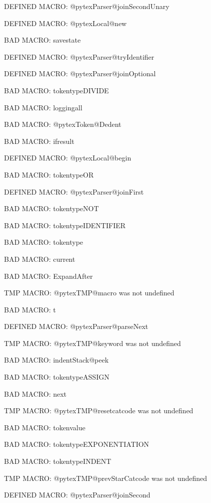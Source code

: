 \ifx\@pytexParser@joinSecondUnary\undefined\else DEFINED MACRO: @pytexParser@joinSecondUnary
\fi

\ifx\@pytexLocal@new\undefined\else DEFINED MACRO: @pytexLocal@new
\fi

BAD MACRO: savestate

\ifx\@pytexParser@tryIdentifier\undefined\else DEFINED MACRO: @pytexParser@tryIdentifier
\fi

\ifx\@pytexParser@joinOptional\undefined\else DEFINED MACRO: @pytexParser@joinOptional
\fi

BAD MACRO: tokentypeDIVIDE

BAD MACRO: loggingall

BAD MACRO: @pytexToken@Dedent

BAD MACRO: ifresult

\ifx\@pytexLocal@begin\undefined\else DEFINED MACRO: @pytexLocal@begin
\fi

BAD MACRO: tokentypeOR

\ifx\@pytexParser@joinFirst\undefined\else DEFINED MACRO: @pytexParser@joinFirst
\fi

BAD MACRO: tokentypeNOT

BAD MACRO: tokentypeIDENTIFIER

BAD MACRO: tokentype

BAD MACRO: current

BAD MACRO: ExpandAfter

\ifx\@pytexTMP@macro\undefined\else TMP MACRO: @pytexTMP@macro was not undefined
\fi

BAD MACRO: t

\ifx\@pytexParser@parseNext\undefined\else DEFINED MACRO: @pytexParser@parseNext
\fi

\ifx\@pytexTMP@keyword\undefined\else TMP MACRO: @pytexTMP@keyword was not undefined
\fi

BAD MACRO: indentStack@peek

BAD MACRO: tokentypeASSIGN

BAD MACRO: next

\ifx\@pytexTMP@resetcatcode\undefined\else TMP MACRO: @pytexTMP@resetcatcode was not undefined
\fi

BAD MACRO: tokenvalue

BAD MACRO: tokentypeEXPONENTIATION

BAD MACRO: tokentypeINDENT

\ifx\@pytexTMP@prevStarCatcode\undefined\else TMP MACRO: @pytexTMP@prevStarCatcode was not undefined
\fi

\ifx\@pytexParser@joinSecond\undefined\else DEFINED MACRO: @pytexParser@joinSecond
\fi

